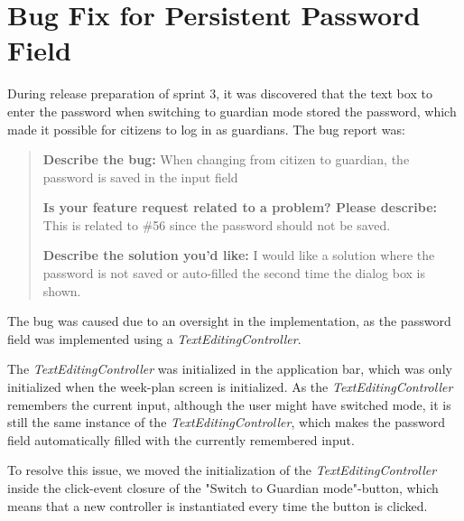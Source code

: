 \section{Bug Fix for Persistent Password Field}

During release preparation of sprint 3, it was discovered that the text box to enter the password when switching to \gls{guardian} mode stored the password, which made it possible for \glspl{citizen} to log in as \glspl{guardian}. The bug report was:

\begin{quote}
  \textbf{Describe the bug:} When changing from citizen to guardian, the password is saved in the input field

  \textbf{Is your feature request related to a problem? Please describe:} This is related to \#56 since the password should not be saved.

  \textbf{Describe the solution you'd like: } I would like a solution where the password is not saved or auto-filled the second time the dialog box is shown.
\end{quote}

The bug was caused due to an oversight in the implementation, as the password field was implemented using a \textit{TextEditingController}. 

The \textit{TextEditingController} was initialized in the application bar, which was only initialized when the week-plan screen is initialized. As the \textit{TextEditingController} remembers the current input, although the user might have switched mode, it is still the same instance of the \textit{TextEditingController}, which makes the password field automatically filled with the currently remembered input.

To resolve this issue, we moved the initialization of the \textit{TextEditingController} inside the click-event closure of the "Switch to Guardian mode"-button, which means that a new controller is instantiated every time the button is clicked.
